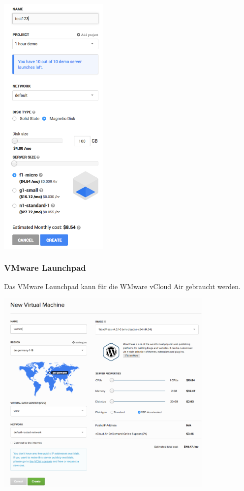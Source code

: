 \documentclass[11pt]{scrartcl}
\begin{document}
\includegraphics[width=0.4\textwidth]{google_instancereation}


\subsubsection{VMware Launchpad}
Das VMware Launchpad kann für die WMware vCloud Air gebraucht werden.

\includegraphics[width=0.8\textwidth]{vmware_creation}
\end{document}
